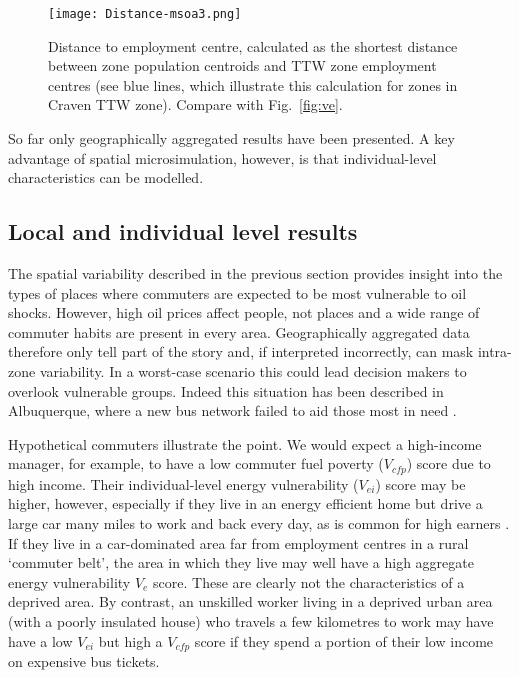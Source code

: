 \begin{figure}[h]
 \centering
   \texttt{[image: Distance-msoa3.png]}
 \caption[Distance to employment centre from zone centroids]{Distance to
employment centre, calculated as the shortest distance
between zone population centroids and TTW zone employment centres (see
blue lines, which illustrate this calculation for zones in Craven TTW zone).
 Compare with Fig.~\ref{fig:ve}.}
 \label{fig:mapttw}
\end{figure}

So far only geographically aggregated results have been presented.
A key advantage of spatial microsimulation, however, is that individual-level
characteristics can be modelled.

\subsection{Local and individual level results}
\label{s:indresults}
The spatial variability described in the previous section
provides insight into the types of places
where commuters are expected to be most vulnerable to oil shocks.
However, high oil prices affect people, not places and a wide range of
commuter habits are present in every area. Geographically
aggregated data therefore only tell part of the story and, if
interpreted incorrectly, can mask intra-zone variability.
In a worst-case scenario this could lead decision makers to
overlook vulnerable groups. Indeed this situation has been described
in Albuquerque, where a new bus network failed to
aid those most in need \citep{Tribby2012}.

Hypothetical commuters illustrate the point. We would expect a
high-income manager, for example, to have a low commuter fuel poverty
($V_{cfp}$)
score due to high income. Their individual-level energy vulnerability ($V_{ei}$)
score may be higher, however,
especially if they live in an energy efficient home but drive a large car
many miles to work and back every day, as is common for high earners
\citep{Green-1999-ld-commute}. If they live in a car-dominated area far from
employment centres in a rural `commuter belt', the area in which they live
may well have a high aggregate energy vulnerability $V_e$ score. These
are clearly not the characteristics of a deprived area.
By contrast, an unskilled worker living in a deprived urban area (with a poorly
insulated house) who travels a few kilometres to work may have have a low
$V_{ei}$ but high a $V_{cfp}$ score if they spend
a portion of their low income on expensive bus tickets.

